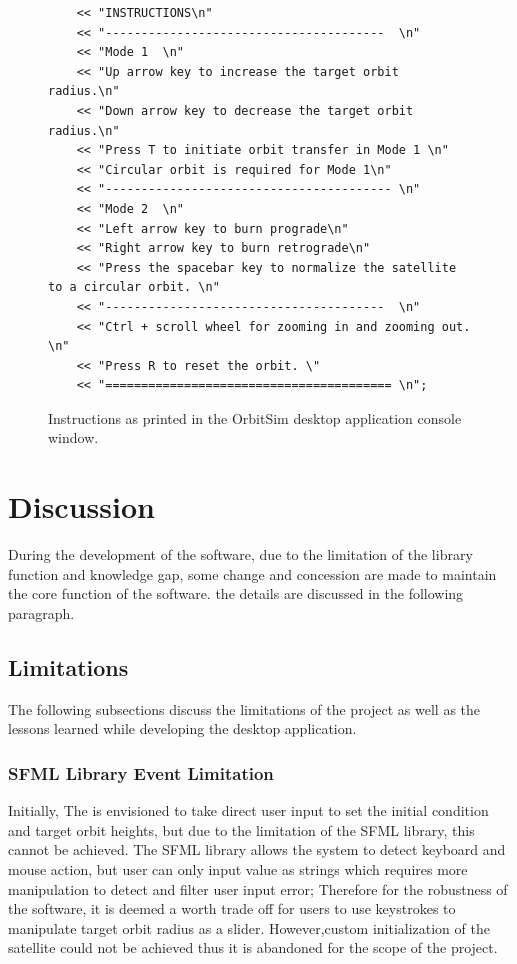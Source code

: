 \documentclass[12pt, letter]{article}
\begin{document}
\begin{figure}[H]
        \begin{verbatim}
    << "INSTRUCTIONS\n"
    << "---------------------------------------  \n"
    << "Mode 1  \n"
    << "Up arrow key to increase the target orbit radius.\n"
    << "Down arrow key to decrease the target orbit radius.\n"
    << "Press T to initiate orbit transfer in Mode 1 \n"
    << "Circular orbit is required for Mode 1\n"
    << "---------------------------------------- \n"
    << "Mode 2  \n"
    << "Left arrow key to burn prograde\n"
    << "Right arrow key to burn retrograde\n"
    << "Press the spacebar key to normalize the satellite to a circular orbit. \n"
    << "---------------------------------------  \n"
    << "Ctrl + scroll wheel for zooming in and zooming out. \n"
    << "Press R to reset the orbit. \"
    << "======================================== \n";
\end{verbatim}
\caption{Instructions as printed in the OrbitSim desktop application console window.}
\label{fig:instructions}
\end{figure}

\clearpage



\section{Discussion}
During the development of the software, due to the limitation of the library function and knowledge gap, some change and concession are made to maintain the core function of the software. the details are discussed in the following paragraph. 

\subsection{Limitations}

The following subsections discuss the limitations of the project as well as the lessons learned while developing the desktop application.
\subsubsection{SFML Library Event Limitation}
Initially, The  is envisioned to take direct user input to set the initial condition and target orbit heights, but due to the limitation of the SFML library, this cannot be achieved. The SFML library allows the system to detect keyboard and mouse action, but user can only input value as strings which requires more manipulation to detect and filter user input error; Therefore for the robustness of the software, it is deemed a worth trade off for users to use keystrokes to manipulate target orbit radius as a slider. However,custom initialization of the satellite could not be achieved thus it is abandoned for the scope of the project.
\end{document}

